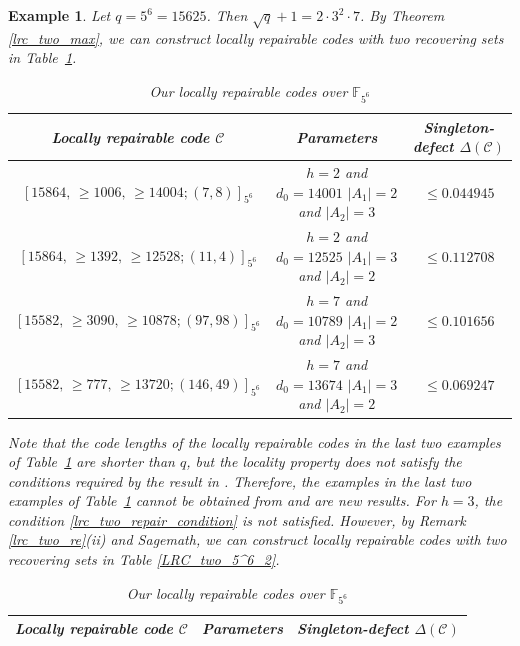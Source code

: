\documentclass[journal,12pt,onecolumn]{IEEEtran}
\newtheorem{example}{Example}
\begin{document}
\begin{example}\label{lrc_two_ex_2}
    Let \(q = 5^6=15625\). Then \(\sqrt{q} + 1 = 2 \cdot 3^2 \cdot 7\). By Theorem \ref{lrc_two_max}, we can construct locally repairable codes with two recovering sets in Table~\ref{LRC_two_5^6_1}. 
    \begin{table}[ht]
	\caption{Our locally repairable codes over $\mathbb{F}_{5^6}$} 
	\centering
	\begin{tabular}{|c|c|c|}
        \toprule[1.2pt]
		Locally repairable code \(\mathcal{C}\) & Parameters & Singleton-defect \( \Delta(\mathcal{C}) \) \\
        \midrule[1.2pt]
        
		\([15864,\,\ge1006,\,\ge 14004;(7,8)]_{5^6}\) & \makecell{\(h = 2\) and \(d_0 = 14001\) \\ \(|A_1| = 2\) and \(|A_2| = 3\)} & \(\le 0.044945\) \\
        \midrule[0.5pt]

        \([15864,\,\ge 1392,\,\ge 12528;(11,4)]_{5^6}\) & \makecell{\(h = 2\) and \(d_0 = 12525\) \\ \(|A_1| = 3\) and \(|A_2| = 2\)} & \(\le 0.112708\) \\

        \midrule[0.5pt]

        \([15582,\,\ge 3090,\,\ge 10878;(97,98)]_{5^6}\) & \makecell{\(h = 7\) and \(d_0 = 10789\) \\ \(|A_1| = 2\) and \(|A_2| = 3\)} & \(\le 0.101656\) \\

        \midrule[0.5pt]

        \([15582,\,\ge 777,\,\ge 13720;(146,49)]_{5^6}\) & \makecell{\(h = 7\) and \(d_0 = 13674\) \\ \(|A_1| = 3\) and \(|A_2| = 2\)} & \(\le 0.069247\) \\
        
        \bottomrule[1.2pt]
	\end{tabular}
	\label{LRC_two_5^6_1}
    \end{table}
    
    Note that the code lengths of the locally repairable codes in the last two examples of Table~\ref{LRC_two_5^6_1} are shorter than \( q \), but the locality property does not satisfy the conditions required by the result in \cite{8865660}. Therefore, the examples in the last two examples of Table~\ref{LRC_two_5^6_1} cannot be obtained from \cite{8865660} and are new results. For \(h = 3\), the condition \eqref{lrc_two_repair_condition} is not satisfied. However, by Remark \ref{lrc_two_re}(ii) and Sagemath, we can construct locally repairable codes with two recovering sets in Table \ref{LRC_two_5^6_2}. 
    \begin{table}[ht]
	\caption{Our locally repairable codes over $\mathbb{F}_{5^6}$} 
	\centering
	\begin{tabular}{|c|c|c|}
        \toprule[1.2pt]
		Locally repairable code \(\mathcal{C}\) & Parameters & Singleton-defect \( \Delta(\mathcal{C}) \) \\
        \midrule[1.2pt]
        

\end{tabular}
\end{table}
\end{example}
\end{document}
